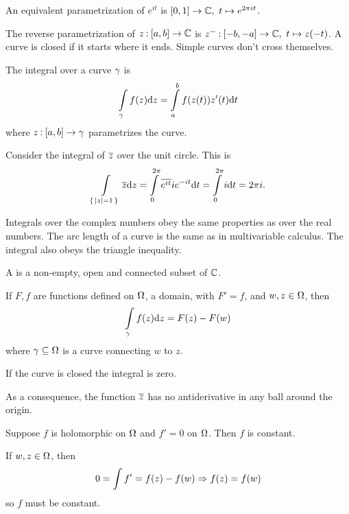 \documentclass[12pt]{memoir}
\begin{document}
\begin{Ex}
    An equivalent parametrization of $e^{it}$ is $[0,1]\to\mathbb{C},\ t\mapsto e^{2\pi i t}$. 
\end{Ex}

The reverse parametrization of $z\mathbin{:}[a,b]\to\mathbb{C}$ is $z^-\mathbin{:}[-b,-a]\to\mathbb{C},\ t\mapsto z(-t)$. A curve is closed if it starts where it ends. Simple curves don't cross themselves.

\begin{Def}
    The integral over a curve $\gamma$ is 
    $$\int\limits_\gamma f(z)\dd z=\int\limits_a^bf(z(t))z'(t)\dd t$$
    where $z\mathbin{:}[a,b]\to\gamma$ parametrizes the curve.
\end{Def}

\begin{Ex}
    Consider the integral of $\overline z$ over the unit circle. This is 
    $$\int\limits_{\{\,|z|=1\,\}}\overline z\dd z=\int\limits_0^{2\pi}\overline{e^{it}}ie^{-it}\dd t=\int\limits_{0}^{2\pi}i\dd t=2\pi i.$$
\end{Ex}

Integrals over the complex numbers obey the same properties as over the real numbers. The arc length of a curve is the same as in multivariable calculus. The integral also obeys the triangle inequality.

\begin{Def}
    A  is a non-empty, open and connected subset of $\mathbb{C}$.
\end{Def}

\begin{Lem}
    If $F,f$ are functions defined on $\Omega$, a domain, with $F'=f$, and $w,z\in\Omega$, then 
    $$\int\limits_\gamma f(z)\dd z=F(z)-F(w)$$
    where $\gamma\subseteq\Omega$ is a curve connecting $w$ to $z$. 
\end{Lem}

\begin{Cor}
If the curve is closed the integral is zero.
\end{Cor}

As a consequence, the function $\overline z$ has no antiderivative in any ball around the origin. 

\begin{Lem}
    Suppose $f$ is holomorphic on $\Omega$ and $f'=0$ on $\Omega$. Then $f$ is constant.
\end{Lem}

\begin{ptcbp}
    If $w,z\in\Omega$, then 
    $$0=\int f'=f(z)-f(w)\Rightarrow f(z)=f(w)$$
    so $f$ must be constant.
\end{ptcbp}
\end{document}
